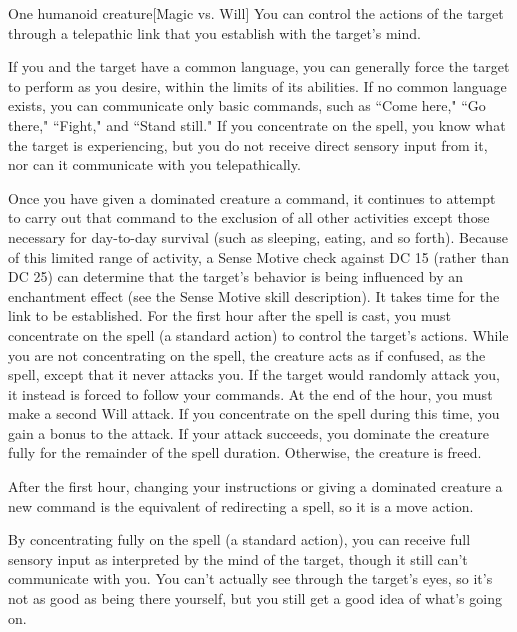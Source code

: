 \spellrng{\rngmed}
\begin{spelltarget}{One humanoid creature}[Magic vs. Will]
    \spellsuccess You can control the actions of the target through a telepathic link that you establish with the target's mind.
    \par If you and the target have a common language, you can generally force the target to perform as you desire, within the limits of its abilities. If no common language exists, you can communicate only basic commands, such as ``Come here," ``Go there," ``Fight," and ``Stand still." If you concentrate on the spell, you know what the target is experiencing, but you do not receive direct sensory input from it, nor can it communicate with you telepathically.
    \par Once you have given a dominated creature a command, it continues to attempt to carry out that command to the exclusion of all other activities except those necessary for day-to-day survival (such as sleeping, eating, and so forth). Because of this limited range of activity, a Sense Motive check against DC 15 (rather than DC 25) can determine that the target's behavior is being influenced by an enchantment effect (see the Sense Motive skill description).
    It takes time for the link to be established. For the first hour after the spell is cast, you must concentrate on the spell (a standard action) to control the target's actions. While you are not concentrating on the spell, the creature acts as if confused, as the  spell, except that it never attacks you. If the target would randomly attack you, it instead is forced to follow your commands. At the end of the hour, you must make a second Will attack. If you concentrate on the spell during this time, you gain a  bonus to the attack. If your attack succeeds, you dominate the creature fully for the remainder of the spell duration. Otherwise, the creature is freed.
    \par After the first hour, changing your instructions or giving a dominated creature a new command is the equivalent of redirecting a spell, so it is a move action.
    \par By concentrating fully on the spell (a standard action), you can receive full sensory input as interpreted by the mind of the target, though it still can't communicate with you. You can't actually see through the target's eyes, so it's not as good as being there yourself, but you still get a good idea of what's going on.

\end{spelltarget}
